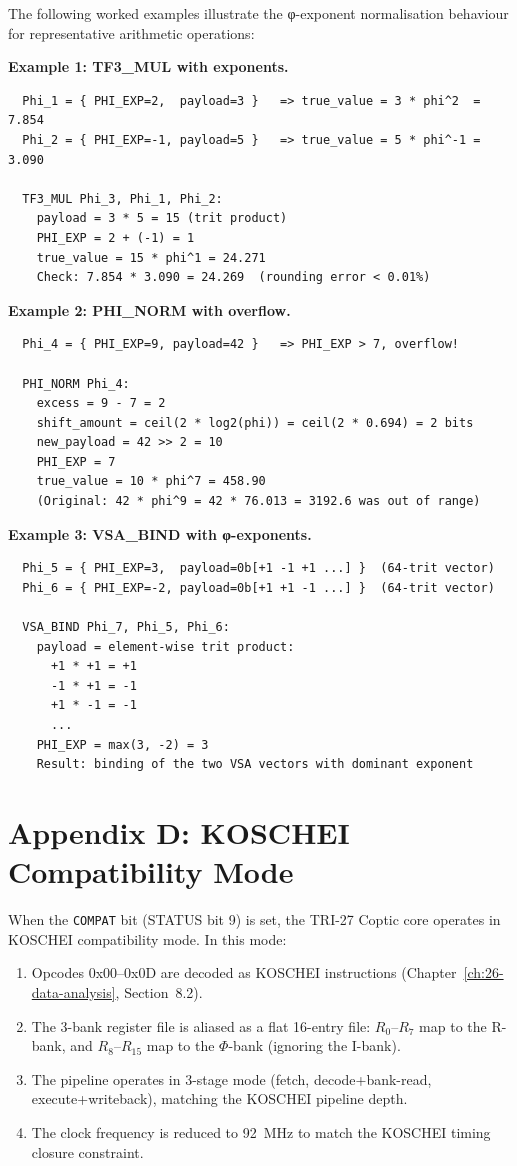 The following worked examples illustrate the φ-exponent
normalisation behaviour for representative arithmetic operations:

\textbf{Example 1: TF3\_MUL with exponents.}

\begin{verbatim}
  Phi_1 = { PHI_EXP=2,  payload=3 }   => true_value = 3 * phi^2  = 7.854
  Phi_2 = { PHI_EXP=-1, payload=5 }   => true_value = 5 * phi^-1 = 3.090

  TF3_MUL Phi_3, Phi_1, Phi_2:
    payload = 3 * 5 = 15 (trit product)
    PHI_EXP = 2 + (-1) = 1
    true_value = 15 * phi^1 = 24.271
    Check: 7.854 * 3.090 = 24.269  (rounding error < 0.01%)
\end{verbatim}

\textbf{Example 2: PHI\_NORM with overflow.}

\begin{verbatim}
  Phi_4 = { PHI_EXP=9, payload=42 }   => PHI_EXP > 7, overflow!

  PHI_NORM Phi_4:
    excess = 9 - 7 = 2
    shift_amount = ceil(2 * log2(phi)) = ceil(2 * 0.694) = 2 bits
    new_payload = 42 >> 2 = 10
    PHI_EXP = 7
    true_value = 10 * phi^7 = 458.90
    (Original: 42 * phi^9 = 42 * 76.013 = 3192.6 was out of range)
\end{verbatim}

\textbf{Example 3: VSA\_BIND with φ-exponents.}

\begin{verbatim}
  Phi_5 = { PHI_EXP=3,  payload=0b[+1 -1 +1 ...] }  (64-trit vector)
  Phi_6 = { PHI_EXP=-2, payload=0b[+1 +1 -1 ...] }  (64-trit vector)

  VSA_BIND Phi_7, Phi_5, Phi_6:
    payload = element-wise trit product:
      +1 * +1 = +1
      -1 * +1 = -1
      +1 * -1 = -1
      ...
    PHI_EXP = max(3, -2) = 3
    Result: binding of the two VSA vectors with dominant exponent
\end{verbatim}

\section{Appendix D: KOSCHEI Compatibility Mode}\label{fa_71:appx-compat}

When the \texttt{COMPAT} bit (STATUS bit 9) is set, the TRI-27
Coptic core operates in KOSCHEI compatibility mode. In this mode:

\begin{enumerate}
\def\labelenumi{\arabic{enumi}.}
\item
  Opcodes 0x00--0x0D are decoded as KOSCHEI instructions
  (Chapter~\ref{ch:26-data-analysis}, Section~8.2).
\item
  The 3-bank register file is aliased as a flat 16-entry file:
  \(R_0\)--\(R_7\) map to the R-bank, and \(R_8\)--\(R_{15}\)
  map to the $\Phi$-bank (ignoring the I-bank).
\item
  The pipeline operates in 3-stage mode (fetch, decode+bank-read,
  execute+writeback), matching the KOSCHEI pipeline depth.
\item
  The clock frequency is reduced to 92~MHz to match the KOSCHEI
  timing closure constraint.
\end{enumerate}


